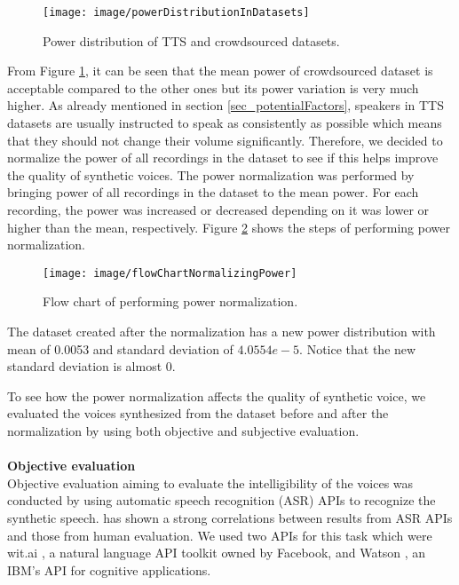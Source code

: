 \documentclass[12pt]{article}
\begin{document}
\begin{figure}[t]
\begin{center}
\texttt{[image: image/powerDistributionInDatasets]}
\end{center}
\vspace{-0.3cm}
\caption[Power distribution in TTS and crowdsourced datasets.]{Power distribution of TTS and crowdsourced datasets.}
\label{fig_powerDistribution}
\end{figure}

From Figure \ref{fig_powerDistribution}, it can be seen that the mean power of crowdsourced dataset is acceptable compared to the other ones but its power variation is very much higher. As already mentioned in section \ref{sec_potentialFactors}, speakers in TTS datasets are usually instructed to speak as consistently as possible \cite{buildingCorpus} which means that they should not change their volume significantly. Therefore, we decided to normalize the power of all recordings in the dataset to see if this helps improve the quality of synthetic voices. The power normalization was performed by bringing power of all recordings in the dataset to the mean power. For each recording, the power was increased or decreased depending on it was lower or higher than the mean, respectively. Figure \ref{fig_normalizingPower} shows the steps of performing power normalization.
\begin{figure}[t]
\begin{center}
\texttt{[image: image/flowChartNormalizingPower]}
\end{center}
\vspace{-0.3cm}
\caption[Flow chart of performing power normalization.]{Flow chart of performing power normalization.}
\label{fig_normalizingPower}
\end{figure}
The dataset created after the normalization has a new power distribution with mean of 0.0053 and standard deviation of $4.0554e-5$. Notice that the new standard deviation is almost 0.

To see how the power normalization affects the quality of synthetic voice, we evaluated the voices synthesized from the dataset before and after the normalization by using both objective and subjective evaluation.\\\\
\textbf{Objective evaluation}
\vspace{0.28cm}\\
Objective evaluation aiming to evaluate the intelligibility of the voices was conducted by using automatic speech recognition (ASR) APIs to recognize the synthetic speech. \cite{utteranceSelectionCooper2017} has shown a strong correlations between results from ASR APIs and those from human evaluation. We used two APIs for this task which were wit.ai \cite{witai}, a natural language API toolkit owned by Facebook, and Watson \cite{watson}, an IBM’s API for cognitive applications.
\end{document}
